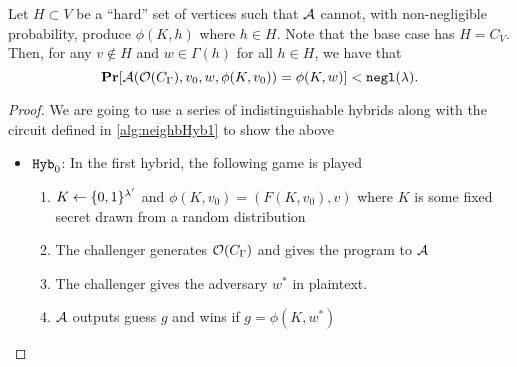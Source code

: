 \begin{lemma}
	Let $H \subset V$ be a ``hard'' set of vertices such that $\mathcal{A}$ cannot, with non-negligible probability, produce 
	$\phi(K, h)$ where $h \in H$. Note that the base case has $H = C_V$. Then, 
	for any $v \notin H$ and $w \in \Gamma(h)$ for all $h \in H$, we have that
	\begin{equation*}
		\operatorname*{\mathbf{Pr}}[\mathcal{A}(\mathcal{O}(C_\Gamma), v_0, w, \phi(K, v_0)) = \phi(K, w)] < \texttt{negl}(\lambda).
	\end{equation*}
	\begin{proof}
		We are going to use a series of indistinguishable hybrids along with the circuit defined in \ref{alg:neighbHyb1} to show the above
		\begin{itemize}
			\item $\texttt{Hyb}_0$: In the first hybrid, the following game is played
				\begin{enumerate}
					\item $K \gets \{0,1\}^{\lambda'}$ and $\phi(K, v_0) = (F(K, v_0), v)$ where $K$ is some fixed secret drawn from a random distribution
					\item The challenger generates $\mathcal{O}(C_\Gamma)$ and gives the program to $\mathcal{A}$
					\item The challenger gives the adversary $w^*$ in plaintext.
					\item $\mathcal{A}$ outputs guess $g$ and wins if $g = \phi(K, w^*)$ %
				\end{enumerate}
			

\end{itemize}
\end{proof}
\end{lemma}
